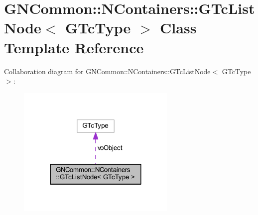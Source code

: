 \hypertarget{class_g_n_common_1_1_n_containers_1_1_g_tc_list_node}{}\section{G\+N\+Common\+:\+:N\+Containers\+:\+:G\+Tc\+List\+Node$<$ G\+Tc\+Type $>$ Class Template Reference}
\label{class_g_n_common_1_1_n_containers_1_1_g_tc_list_node}


Collaboration diagram for G\+N\+Common\+:\+:N\+Containers\+:\+:G\+Tc\+List\+Node$<$ G\+Tc\+Type $>$\+:
\nopagebreak
\begin{figure}[H]
\begin{center}
\leavevmode
\includegraphics[width=216pt]{class_g_n_common_1_1_n_containers_1_1_g_tc_list_node__coll__graph}
\end{center}
\end{figure}
